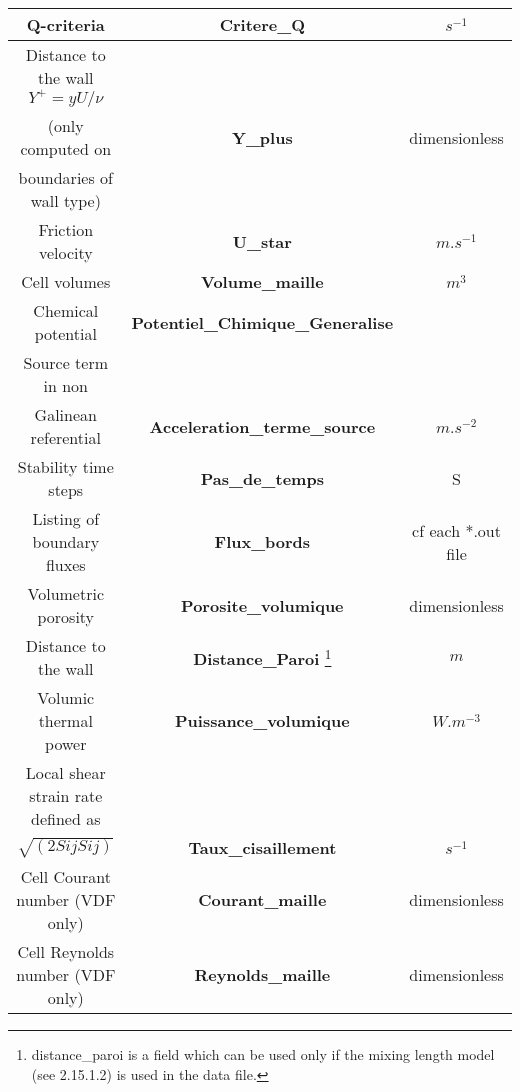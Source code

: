 \begin{longtable}[hcr]{|c|c|c|}
Q-criteria                                      & \textbf{Critere\_Q}                       & $s^{-1}$ \\ \hline
Distance to the wall $Y^+=yU/\nu$               &                                           & \\ 
(only computed on                               & \textbf{Y\_plus}                          & dimensionless \\ 
boundaries of wall type)                        &                                           &  \\ \hline
Friction velocity                               & \textbf{U\_star}                          & $m.s^{-1}$ \\ \hline
Cell volumes                                    & \textbf{Volume\_maille}                   & $m^3$ \\ \hline
Chemical potential                              & \textbf{Potentiel\_Chimique\_Generalise}  & \\ \hline
Source term in non                              &                                           & \\
Galinean referential                            & \textbf{Acceleration\_terme\_source}      & $m.s^{-2}$ \\ \hline
Stability time steps                            & \textbf{Pas\_de\_temps}                   & S \\ \hline
Listing of boundary fluxes                      & \textbf{Flux\_bords}                      & cf each *.out file \\ \hline
Volumetric porosity                             & \textbf{Porosite\_volumique}              & dimensionless \\ \hline
Distance to the wall                            & \textbf{Distance\_Paroi} \footnote{distance\_paroi is a field which can be used only if the mixing length model (see 2.15.1.2) is used in the data file.}              & $m$\\ \hline
Volumic thermal power                           & \textbf{Puissance\_volumique}             & $W.m^{-3}$ \\ \hline
Local shear strain rate defined as              &                                           & \\
$\sqrt{(2SijSij)}$                              & \textbf{Taux\_cisaillement}               & $s^{-1}$ \\ \hline
Cell Courant number (VDF only)                  & \textbf{Courant\_maille}                  & dimensionless \\ \hline
Cell Reynolds number (VDF only)                 & \textbf{Reynolds\_maille}                 & dimensionless \\ \hline
\end{longtable}

